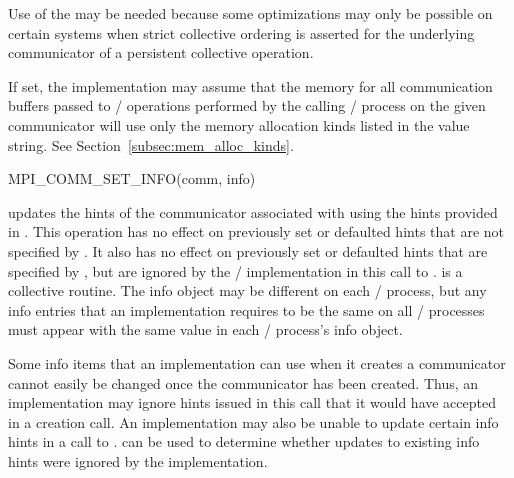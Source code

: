 \begin{description}
\begin{users}
Use of the  may
be needed because some optimizations may only be possible on certain
systems when strict collective ordering is asserted for the
underlying communicator of a persistent collective operation.
\end{users}

\item[\infokey{mpi\_assert\_memory\_alloc\_kinds} (string, not set by default):]
If set, the implementation may assume that the memory for all
communication buffers passed to \MPI/ operations performed by the calling \MPI/
process on the given communicator will use only the memory allocation kinds
listed in the value string. See Section~\ref{subsec:mem_alloc_kinds}.

\end{description}

%
\begin{funcdef}{MPI\_COMM\_SET\_INFO}{(\mbox{comm}, \mbox{info})}
\end{funcdef}

 updates the hints of the communicator
associated with  using the hints provided in .
This operation has no effect on previously set or defaulted hints that
are not specified by . It also has no effect on previously
set or defaulted hints that are specified by , but are
ignored by the \MPI/ implementation in this call to
.
 is a collective
routine. The info object may be different on each \MPI/ process, but any
info entries that an implementation requires to be the same on all
\MPI/ processes must appear with the same value in each \MPI/ process's info
object.

\begin{users}
Some info items that an implementation can use when it creates a
communicator cannot easily be changed once the communicator has been
created. Thus, an implementation may ignore hints issued in this call
that it would have accepted in a creation call.
An implementation may also be unable to update certain info hints in a call to .
 can be used to determine whether updates
to existing info hints were ignored by the implementation.
\end{users}

